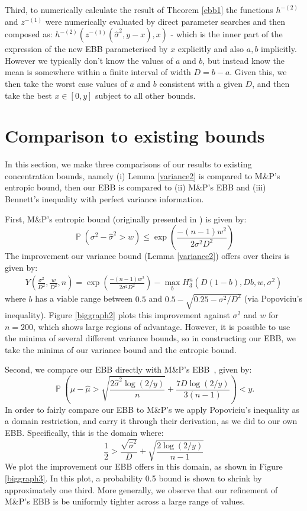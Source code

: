 \documentclass[runningheads, envcountsame, a4paper]{llncs}
\DeclareMathOperator{\p}{\mathbb{P}}
\begin{document}
Third, to numerically calculate the result of Theorem \ref{ebb1} the functions $h^{-(2)}$ and $z^{-(1)}$ were numerically evaluated by direct parameter searches and then composed as:
$h^{-(2)}(z^{-(1)}(\hat{\sigma}^2,y-x),x)$ - which is the inner part of the expression of the new EBB parameterised by $x$ explicitly and also $a,b$ implicitly.
%
However we typically don't know the values of $a$ and $b$, but instead know the mean is somewhere within a finite interval of width $D=b-a$.
Given this, we then take the worst case values of $a$ and $b$ consistent with a given $D$, 
and then take the best $x\in[0,y]$ subject to all other bounds.


\section{Comparison to existing bounds}\label{evaluation}
In this section, we make three comparisons of our results to existing concentration bounds, namely (i) Lemma \ref{variance2} is compared to M\&P's entropic bound, then 
our EBB is compared to (ii) M\&P's EBB and (iii) Bennett's inequality with perfect variance information.

First, M\&P's entropic bound \cite{Maurer50empiricalbernstein} 
(originally presented in \cite{MR2245497}) 
is given by:
\begin{equation}\label{eq:fe} 
\p(\sigma^2 - \hat{\sigma}^2>w) \le \exp\left(\frac{-(n-1)w^2}{2\sigma^2D^2}\right) 
\end{equation}
%
The improvement our variance bound (Lemma \ref{variance2}) offers over theirs is given by:
\begin{align}
Y\left(\frac{\sigma^2}{D^2},\frac{w}{D^2},n\right)
 =\exp\left(\frac{-(n-1)w^2}{2\sigma^2D^2}\right) -\max_{b} H_3^n\left(D(1-b),Db,w,\sigma^2\right)\label{eq:advantage}
\end{align}
where $b$ has a viable range between $0.5$ and $0.5-\sqrt{0.25-\sigma^2/D^2}$ (via Popoviciu's inequality).
Figure \ref{biggraph2} plots this improvement against $\sigma^2$ and $w$ for $n=200$, which shows large regions of advantage.
However, it is possible to use the minima of several different variance bounds, so in constructing our EBB, we take the minima of our variance bound and the entropic bound.

Second, we compare our EBB directly with M\&P's EBB~\cite{Maurer50empiricalbernstein}, 
given by:
\begin{equation}\label{maurersbound} \p\left(\mu-\hat{\mu}>\sqrt{\frac{2\hat{\sigma}^2\log(2/y)}{n}}+\frac{7D\log(2/y)}{3(n-1)}\right)<y. \end{equation}
In order to fairly compare our EBB to M\&P's we apply Popoviciu's inequality as a domain restriction, 
and carry it through their derivation, as we did to our own EBB. 
Specifically, this is the domain where:
\[ \frac{1}{2}>\frac{\sqrt{\hat{\sigma}^2}}{D}+\sqrt{\frac{2\log(2/y)}{n-1}} \]
We plot the improvement our EBB offers in this domain, as shown in Figure \ref{biggraph3}. 
In this plot, a probability 0.5 bound is shown to shrink by approximately one third.
More generally, we observe that our refinement of M\&P's EBB is be uniformly tighter across a large range of values.
\end{document}
